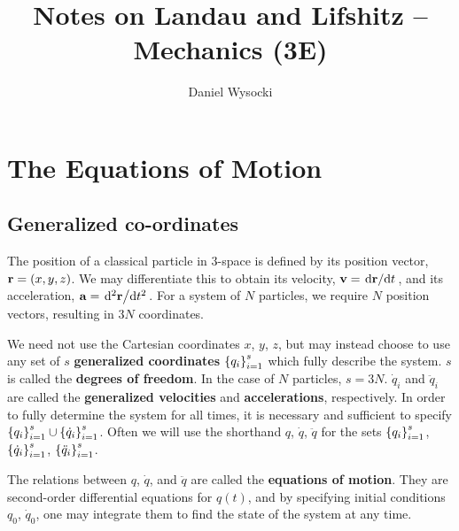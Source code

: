 \documentclass{book}
\title{Notes on Landau and Lifshitz -- Mechanics (3E)}
\author{Daniel Wysocki}
\date{}
\newcommand\normalsecnums{%
    \renewcommand\thesection{\thechapter.\arabic{section}}}
\let\origchapter\chapter
\renewcommand{\chapter}[1]{\normalsecnums
    \origchapter{#1}}
\begin{document}
\maketitle

\tableofcontents


\chapter{The Equations of Motion}


\section{Generalized co-ordinates}

The position of a classical particle in 3-space is defined by its position vector, $\vb{r} = (x, y, z)$. We may differentiate this to obtain its velocity, $\vb{v} = \dv*{\vb{r}}{t}$, and its acceleration, $\vb{a} = \dv*[2]{\vb{r}}{t}$. For a system of $N$ particles, we require $N$ position vectors, resulting in $3N$ coordinates.

We need not use the Cartesian coordinates $x$, $y$, $z$, but may instead choose to use any set of $s$ \textbf{generalized coordinates} $\qty{q_i}_{i=1}^s$ which fully describe the system. $s$ is called the \textbf{degrees of freedom}. In the case of $N$ particles, $s = 3N$. $\dot{q}_i$ and $\ddot{q}_i$ are called the \textbf{generalized velocities} and \textbf{accelerations}, respectively. In order to fully determine the system for all times, it is necessary and sufficient to specify $\qty{q_i}_{i=1}^s \cup \qty{\dot{q}_i}_{i=1}^s$. Often we will use the shorthand $q$, $\dot{q}$, $\ddot{q}$ for the sets $\qty{q_i}_{i=1}^s$, $\qty{\dot{q}_i}_{i=1}^s$, $\qty{\ddot{q}_i}_{i=1}^s$.

The relations between $q$, $\dot{q}$, and $\ddot{q}$ are called the \textbf{equations of motion}. They are second-order differential equations for $q(t)$, and by specifying initial conditions $q_0$, $\dot{q}_0$, one may integrate them to find the state of the system at any time.


\end{document}
